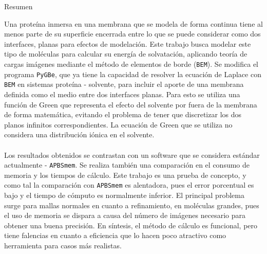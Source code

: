 \begin{centering}
	\Large{Resumen\\}\bigskip
\end{centering}
\noindent
Una proteína inmersa en una membrana que se modela de forma continua tiene al menos parte de su superficie encerrada entre lo que se puede considerar como dos interfaces, planas para efectos de modelación. Este trabajo busca modelar este tipo de moléculas para calcular su energía de solvatación, aplicando teoría de cargas imágenes mediante el método de elementos de borde (\texttt{BEM}). Se modifica el programa \texttt{PyGBe}, que ya tiene la capacidad de resolver la ecuación de Laplace con \texttt{BEM} en sistemas proteína - solvente, para incluir el aporte de una membrana definida como el medio entre dos interfaces planas. Para esto se utiliza una función de Green que representa el efecto del solvente por fuera de la membrana de forma matemática, evitando el problema de tener que discretizar los dos planos infinitos correspondientes. La ecuación de Green que se utiliza no considera una distribución iónica en el solvente.\\\\
Los resultados obtenidos se contrastan con un software que se considera estándar actualmente - \texttt{APBSmem}. Se realiza también una comparación en el consumo de memoria y los tiempos de cálculo. Este trabajo es una prueba de concepto, y como tal la comparación con \texttt{APBSmem} es alentadora, pues el error porcentual es bajo y el tiempo de cómputo es normalmente inferior. El principal problema surge para mallas normales en cuanto a refinamiento, en moléculas grandes, pues el uso de memoria se dispara a causa del número de imágenes necesario para obtener una buena precisión. En síntesis, el método de cálculo es funcional, pero tiene falencias en cuanto a eficiencia que lo hacen poco atractivo como herramienta para casos más realistas.